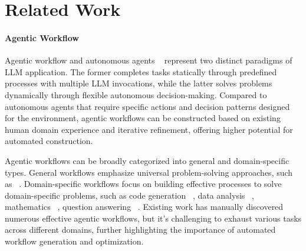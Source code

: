 \documentclass{article} %
\theoremstyle{plain}
\theoremstyle{definition}
\theoremstyle{remark}
\begin{document}

\section{Related Work}

\paragraph{Agentic Workflow}
Agentic workflow and autonomous agents ~\citep{zhuge2023mindstorms, hong2024data, jia2024mobile, wang2023voyager} represent two distinct paradigms of LLM application. The former completes tasks statically through predefined processes with multiple LLM invocations, while the latter solves problems dynamically through flexible autonomous decision-making. Compared to autonomous agents that require specific actions and decision patterns designed for the environment, agentic workflows can be constructed based on existing human domain experience and iterative refinement, offering higher potential for automated construction.

Agentic workflows can be broadly categorized into general and domain-specific types. General workflows emphasize universal problem-solving approaches, such as ~\citep{wei2022COT, wang2022COTSC, madaan2023self, wang2023multipersona}. Domain-specific workflows focus on building effective processes to solve domain-specific problems, such as code generation ~\citep{sirui2024meta, Tal2024Alpha, li2024debug}, data analysis ~\citep{yu2024hai, yi2024gen, bo2024nlsql, zhou2023llm}, mathematics ~\citep{zhong2024achieving, xu2024lemur}, question answering ~\citep{nori2023medprompt, zhou2024language}. Existing work has manually discovered numerous effective agentic workflows, but it's challenging to exhaust various tasks across different domains, further highlighting the importance of automated workflow generation and optimization. 


\end{document}
